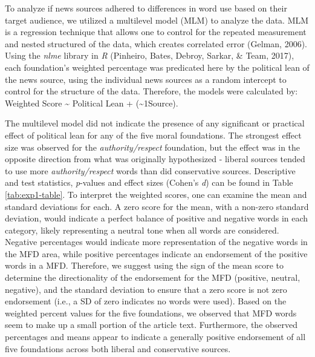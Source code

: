 \documentclass[
  man,floatsintext]{apa6}
\begin{document}
To analyze if news sources adhered to differences in word use based on
their target audience, we utilized a multilevel model (MLM) to analyze
the data. MLM is a regression technique that allows one to control for
the repeated measurement and nested structured of the data, which
creates correlated error (Gelman, 2006). Using the \emph{nlme} library in \emph{R}
(Pinheiro, Bates, Debroy, Sarkar, \& Team, 2017), each foundation's weighted percentage was predicated
here by the political lean of the news source, using the individual news
sources as a random intercept to control for the structure of the data.
Therefore, the models were calculated by: Weighted Score \textasciitilde{} Political
Lean + (\textasciitilde1\textbar Source).

The multilevel model did not indicate the presence of any significant or
practical effect of political lean for any of the five moral
foundations. The strongest effect size was observed for the
\emph{authority/respect} foundation, but the effect was in the opposite
direction from what was originally hypothesized - liberal sources tended
to use more \emph{authority/respect} words than did conservative sources.
Descriptive and test statistics, \emph{p}-values and effect sizes (Cohen's
\emph{d}) can be found in Table \ref{tab:exp1-table}. To interpret the
weighted scores, one can examine the mean and standard deviations for
each. A zero score for the mean, with a non-zero standard deviation,
would indicate a perfect balance of positive and negative words in each
category, likely representing a neutral tone when all words are
considered. Negative percentages would indicate more representation of
the negative words in the MFD area, while positive percentages indicate
an endorsement of the positive words in a MFD. Therefore, we suggest
using the sign of the mean score to determine the directionality of the
endorsement for the MFD (positive, neutral, negative), and the standard
deviation to ensure that a zero score is not zero endorsement (i.e., a
SD of zero indicates no words were used). Based on the weighted percent
values for the five foundations, we observed that MFD words seem to make
up a small portion of the article text. Furthermore, the observed
percentages and means appear to indicate a generally positive
endorsement of all five foundations across both liberal and conservative
sources.
\end{document}
